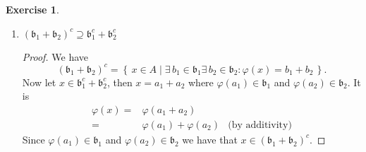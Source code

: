 \documentclass{book}
\theoremstyle{plain}
\theoremstyle{definition}
\newtheorem{exr}[thm]{Exercise}
\theoremstyle{custom_definition}
\newcommand{\makeset}[2]{\left\{\, #1 \mid #2 \,\right\}}
\begin{document}
\begin{exr}
\begin{enumerate}
\begin{proof}
      I think the above proof should work into both directions.
    \end{proof}
    \item \((\mathfrak{b}_1 + \mathfrak{b}_2)^c \supseteq \mathfrak{b}_1^c + \mathfrak{b}_2^c\)
    \begin{proof}
      We have
      \begin{equation}
        (\mathfrak{b}_1 + \mathfrak{b}_2)^c = \makeset{x \in A}{\exists \, b_1 \in \mathfrak{b}_1 \exists \, b_2 \in \mathfrak{b}_2 : \varphi(x) = b_1 + b_2} \text{.}
      \end{equation}
      Now let \(x \in \mathfrak{b}_1^c + \mathfrak{b}_2^c\), then \(x = a_1 + a_2\) where \(\varphi(a_1) \in \mathfrak{b}_1\) and \(\varphi(a_2) \in \mathfrak{b}_2\). It is
      \begin{align}
        \varphi(x) =& \varphi(a_1 + a_2) & \\
        =& \varphi(a_1) + \varphi(a_2) & \text{(by additivity)}
      \end{align}
      Since \(\varphi(a_1) \in \mathfrak{b}_1\) and \(\varphi(a_2) \in \mathfrak{b}_2\) we have that \(x \in (\mathfrak{b}_1 + \mathfrak{b}_2)^c\).
    \end{proof}
  \end{enumerate}
\end{exr}
\end{document}
